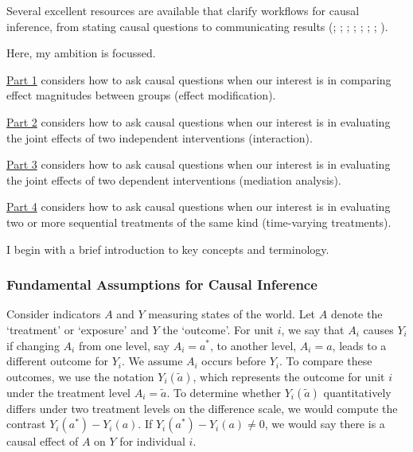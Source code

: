 \documentclass[
  single column]{article}
\begin{document}
Several excellent resources are available that clarify workflows for
causal inference, from stating causal questions to communicating results
(;
;
;
;
;
;
;
).

Here, my ambition is focussed.

\hyperref[id-sec-1]{Part 1} considers how to ask causal questions when
our interest is in comparing effect magnitudes between groups (effect
modification).

\hyperref[id-sec-2]{Part 2} considers how to ask causal questions when
our interest is in evaluating the joint effects of two independent
interventions (interaction).

\hyperref[id-sec-3]{Part 3} considers how to ask causal questions when
our interest is in evaluating the joint effects of two dependent
interventions (mediation analysis).

\hyperref[id-sec-4]{Part 4} considers how to ask causal questions when
our interest is in evaluating two or more sequential treatments of the
same kind (time-varying treatments).

I begin with a brief introduction to key concepts and terminology.

\subsubsection{Fundamental Assumptions for Causal
Inference}\label{fundamental-assumptions-for-causal-inference}

Consider indicators \(A\) and \(Y\) measuring states of the world. Let
\(A\) denote the `treatment' or `exposure' and \(Y\) the `outcome'. For
unit \(i\), we say that \(A_i\) causes \(Y_i\) if changing \(A_i\) from
one level, say \(A_i = a^*\), to another level, \(A_i = a\), leads to a
different outcome for \(Y_i\). We assume \(A_i\) occurs before \(Y_i\).
To compare these outcomes, we use the notation \(Y_i(\tilde{a})\), which
represents the outcome for unit \(i\) under the treatment level
\(A_i = \tilde{a}\). To determine whether \(Y_i(\tilde{a})\)
quantitatively differs under two treatment levels on the difference
scale, we would compute the contrast \(Y_i(a^*) - Y_i(a)\). If
\(Y_i(a^*) - Y_i(a) \neq 0\), we would say there is a causal effect of
\(A\) on \(Y\) for individual \(i\).
\end{document}
